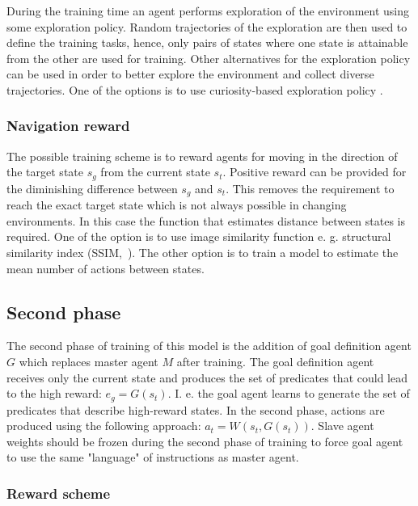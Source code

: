\documentclass{article}
\begin{document}
During the training time an agent performs exploration of the environment using some exploration policy. Random trajectories of the exploration are then used to define the training tasks, hence, only pairs of states where one state is attainable from the other are used for training. Other alternatives for the exploration policy can be used in order to better explore the environment and collect diverse trajectories. One of the options is to use curiosity-based exploration policy \citep{Pathak2017CuriosityDrivenEB, Burda2019ExplorationBR}.

\subsubsection{Navigation reward}

The possible training scheme is to reward agents for moving in the direction of the target state $s_g$ from the current state $s_t$. Positive reward can be provided for the diminishing difference between $s_g$ and $s_t$. This removes the requirement to reach the exact target state which is not always possible in changing environments. In this case the function that estimates distance between states is required. One of the option is to use image similarity function e. g. structural similarity index (SSIM,~\citep{Wang2004ImageQA}). The other option is to train a model to estimate the mean number of actions between states.

\subsection{Second phase}

The second phase of training of this model is the addition of goal definition agent $G$ which replaces master agent $M$ after training. The goal definition agent receives only the current state and produces the set of predicates that could lead to the high reward: $e_g = G(s_t)$. I. e. the goal agent learns to generate the set of predicates that describe high-reward states. In the second phase, actions are produced using the following approach: $a_t = W(s_t, G(s_t))$. Slave agent weights should be frozen during the second phase of training to force goal agent to use the same "language" of instructions as master agent.

\subsubsection{Reward scheme}
\end{document}
